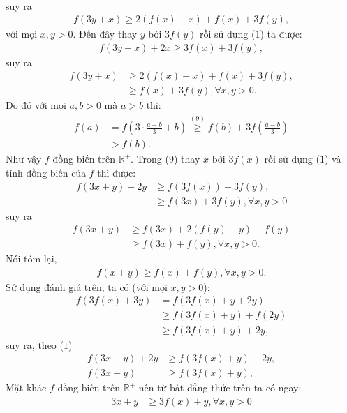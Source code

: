 \begin{multicols}{2}
\begin{align*}
	\end{align*}
	suy ra
	\begin{align*}
	f(3y + x) \ge 2(f(x) - x) + f(x) + 3f(y), 
	\end{align*}
	với mọi $x,y > 0$.
	Đến đây thay $y$ bởi $3f(y)$  rồi sử dụng ($1$) ta được: 
	\begin{align*}
		f(3y \!+\! x) \!+\! 2x \ge 3f(x) \!+\! 3f(y),
	\end{align*}
	suy ra
	\begin{align*}
		f(3y + x) &\ge 2(f(x) - x) + f(x) + 3f(y),\\
		&\ge f(x) + 3f(y),\forall x,y > 0. \tag{$9$}
	\end{align*}
	Do đó với mọi $a,b > 0$  mà $a > b$  thì: 
	\begin{align*}
		f(a) &= f(3 \cdot \frac{{a - b}}{3} + b)\mathop  \ge \limits^{(9)} f(b) + 3f(\frac{{a - b}}{3})\\
		& > f(b).
	\end{align*}
	Như vậy $f$  đồng biến trên $\mathbb{R^+}$.
	\vskip 0.1cm 
	Trong ($9$)  thay $x$  bởi $3f(x)$  rồi sử dụng ($1$) và tính đồng biến của $f$ thì được: 
	\begin{align*}
		f(3x \!+\! y) \!+\! 2y 
		&\!\ge\! f(3f(x)) \!+\! 3f(y),\tag{$10$}\\
		&\!\ge\! f(3x) \!+\! 3f(y),\forall x,y > 0
	\end{align*}
	suy ra
	\begin{align*}
		f(3x + y) &\ge f(3x) \!+\! 2(f(y) \!-\! y) \!+\! f(y)\\
		&\ge f(3x) + f(y),\forall x,y > 0.
	\end{align*}
	Nói tóm lại, 
	\begin{align*}
		f(x + y) \ge f(x) + f(y),\forall x,y > 0.
	\end{align*}
	Sử dụng đánh giá trên, ta có (với mọi $x,y >0$): 
	\begin{align*}
		f(3f(x) + 3y) &= f(3f(x) + y + 2y)\\
		&\ge f(3f(x) + y) + f(2y)\\
		&\ge f(3f(x) + y) + 2y,
	\end{align*}
	suy ra, theo ($1$)
	\begin{align*}
		f(3x + y) + 2y &\ge f(3f(x) + y) + 2y,\\
		f(3x + y) &\ge f(3f(x) + y),
	\end{align*}
	Mặt khác $f$  đồng biến trên $\mathbb{R^+}$  nên từ bất đẳng thức trên ta có ngay: 
	\begin{align*}
		3x + y &\ge 3f(x) + y,\forall x,y > 0\\

\end{align*}
\end{multicols}
